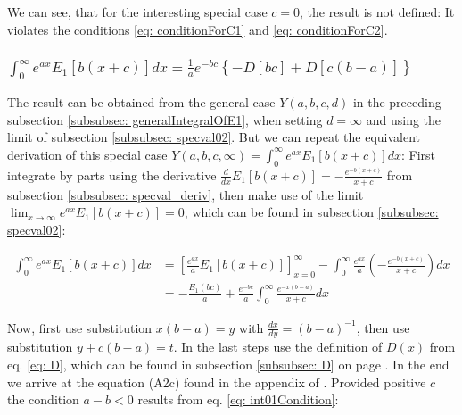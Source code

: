\documentclass[bibliography=totocnumbered]{scrartcl}
\begin{document}
	We can see, that for the interesting special case $c=0$, the result is not defined: It violates the conditions \eqref{eq: conditionForC1} and \eqref{eq: conditionForC2}.
	
	\subsubsection[A integral of E1, involving the exponential function]{$\int_{0}^{\infty}e^{ax}E_1\left[b\left(x+c\right)\right]dx=\frac{1}{a}e^{-bc}\left\{-D\left[bc\right]+D\left[c\left(b-a\right)\right]\right\}$}
	\label{subsubsec: generalIntegralOfE2}
	
	
	The result can be obtained from the general case $Y\left(a, b, c, d\right)$ in the preceding subsection \ref{subsubsec: generalIntegralOfE1}, when setting $d=\infty$ and using the limit of subsection \ref{subsubsec: specval02}. But we can repeat the equivalent derivation of this special case $Y\left(a, b, c, \infty\right)=\int_{0}^{\infty}e^{ax}E_1\left[b\left(x+c\right)\right]dx$: First integrate by parts using the derivative $\frac{d}{dx}E_1\left[b\left(x+c\right)\right]=-\frac{e^{-b\left(x+c\right)}}{x+c}$ from subsection \ref{subsubsec: specval_deriv}, then make use of the limit $\lim_{x\rightarrow\infty}e^{ax}E_1\left[b\left(x+c\right)\right]=0$, which can be found in subsection \ref{subsubsec: specval02}:
	
	\begin{align}
		\int_{0}^{\infty}e^{ax}E_1\left[b\left(x+c\right)\right]dx&=\left[\frac{e^{ax}}{a}E_1\left[b\left(x+c\right)\right]\right]^{\infty}_{x=0}-\int_{0}^{\infty}\frac{e^{ax}}{a}\left(-\frac{e^{-b\left(x+c\right)}}{x+c}\right)dx\\
		&=-\frac{E_1\left(bc\right)}{a}+\frac{e^{-bc}}{a}\int_{0}^{\infty}\frac{e^{-x\left(b-a\right)}}{x+c}dx
	\end{align}
	
	Now, first use substitution $x\left(b-a\right)=y$ with $\frac{dx}{dy}=\left(b-a\right)^{-1}$, then use substitution $y+c\left(b-a\right)=t$. In the last steps use the definition of $D\left(x\right)$ from eq. \eqref{eq: D}, which can be found in subsection \ref{subsubsec: D} on page \pageref{subsubsec: D}. In the end we arrive at the equation (A2c) found in the appendix of \cite{boer1990calc}. Provided positive $c$ the condition $a-b<0$ results from eq. \eqref{eq: int01Condition}:
	
\end{document}
